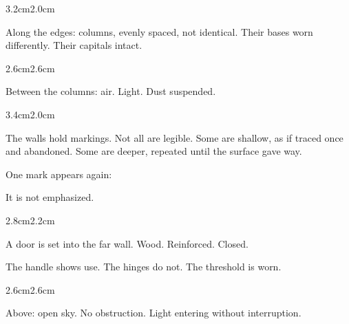 \begin{adjustwidth}{3.2cm}{2.0cm}

Along the edges: columns, evenly spaced, not identical. Their bases worn
differently. Their capitals intact.

\vspace{2em}

\end{adjustwidth}

\begin{adjustwidth}{2.6cm}{2.6cm}

Between the columns: air. Light. Dust suspended.

\vspace{2em}

\end{adjustwidth}

\begin{adjustwidth}{3.4cm}{2.0cm}

The walls hold markings. Not all are legible. Some are shallow, as if traced
once and abandoned. Some are deeper, repeated until the surface gave way.

\vspace{1em}

One mark appears again:

\vspace{1em}


\vspace{1em}

It is not emphasized.

\vspace{2em}

\end{adjustwidth}

\begin{adjustwidth}{2.8cm}{2.2cm}

A door is set into the far wall. Wood. Reinforced. Closed.

\vspace{2em}

The handle shows use. The hinges do not. The threshold is worn.

\vspace{2em}

\end{adjustwidth}

\begin{adjustwidth}{2.6cm}{2.6cm}

Above: open sky. No obstruction. Light entering without interruption.

\vspace{2em}

\end{adjustwidth}

